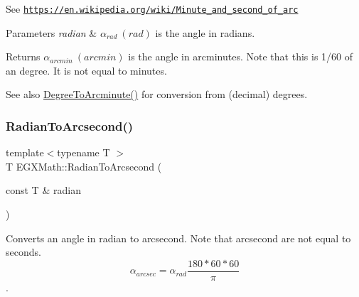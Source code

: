 See \href{https://en.wikipedia.org/wiki/Minute_and_second_of_arc}{\tt https\+://en.\+wikipedia.\+org/wiki/\+Minute\+\_\+and\+\_\+second\+\_\+of\+\_\+arc} 
\begin{DoxyParams}{Parameters}
{\em radian} & $\alpha_{rad}\ (rad)$ is the angle in radians. \\
\hline
\end{DoxyParams}
\begin{DoxyReturn}{Returns}
$\alpha_{arcmin}\ (arcmin)$ is the angle in arcminutes. Note that this is 1/60 of an degree. It is not equal to minutes. 
\end{DoxyReturn}
\begin{DoxySeeAlso}{See also}
\mbox{\hyperlink{group___e_g_x_math-_angle_conversions-_degree_ga8abf327dc5f52907b2c881999e9cc43e}{Degree\+To\+Arcminute()}} for conversion from (decimal) degrees. 
\end{DoxySeeAlso}
\mbox{\label{group___e_g_x_math-_angle_conversions-_radian_ga2f952f6675a0fc54bf72bfe4e3d2664a}} 
\subsubsection{\texorpdfstring{Radian\+To\+Arcsecond()}{RadianToArcsecond()}}
{\footnotesize\ttfamily template$<$typename T $>$ \\
T E\+G\+X\+Math\+::\+Radian\+To\+Arcsecond (\begin{DoxyParamCaption}\item[{const T \&}]{radian }\end{DoxyParamCaption})}



Converts an angle in radian to arcsecond. Note that arcsecond are not equal to seconds. \[\alpha_{arcsec}=\alpha_{rad}\frac{180 * 60 * 60}{\pi}\]. 

